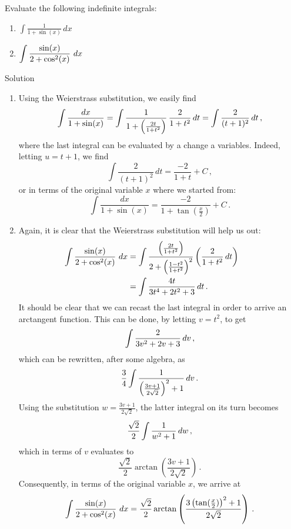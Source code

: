 \begin{example}
Evaluate the following indefinite integrals:
\begin{multicols}{2}
\begin{enumerate}
    \item $\displaystyle {\int\frac {1}{1+\sin(x)}}\,dx $
\item $\ds \int \frac{\sin(x)}{2+\cos^2(x)}\ dx$
\end{enumerate}
\end{multicols}

\pagebreak
{}Solution 


\begin{enumerate}
\item  Using the Weierstrass substitution, we easily find
$$
\displaystyle \int{\frac {dx}{1+\sin(x)}}=\displaystyle\int {\dfrac {1}{1+\left({\frac {2t}{1+t^{2}}}\right)}}\,\dfrac {2}{1+t^{2}}\,dt=\int{\dfrac {2}{(t+1)^{2}}}\,dt\,,
$$
where the last integral can be evaluated by a change a variables. Indeed, letting $u=t+1$, we find 
$$
\int{\dfrac {2}{(t+1)^{2}}}\,dt=\dfrac{-2}{1+t}+C\,,
$$
or in terms of the original variable $x$ where we started from:
$$
\displaystyle \int{\frac {dx}{1+\sin(x)}}=\dfrac{-2}{1+\tan\left(\frac{x}{2}\right)}+C\,.
$$
\item Again, it is clear that the Weierstrass substitution will help us out:
$$
{\displaystyle {\begin{aligned}\displaystyle\int \frac{\sin(x)}{2+\cos^2(x)}\ dx&=\int {\frac {\left({\frac {2t}{1+t^{2}}}\right)}{2+\left({\frac {1-t^2}{1+t^{2}}}\right)^2}}\left({\frac {2}{1+t^{2}}}\,dt\right)\\
&=\int {\frac {4t}{3t^4+2t^2+3}}\,dt\,.&&\end{aligned}}}
$$
It should be clear that we can recast the last integral in order to arrive an arctangent function. This can be done, by letting $v=t^2$, to get 
$$
\displaystyle\int {\frac {2}{3v^2+2v+3}}\,dv\,,
$$
which can be rewritten, after some algebra, as
$$
\dfrac{3}{4}\displaystyle\int {\dfrac {1}{\left(\frac{3v+1}{2\sqrt{2}}\right)^2+1}}\,dv\,.
$$
Using the substitution $w=\frac{3v+1}{2\sqrt{2}}$, the latter integral on its turn becomes
$$
\dfrac{\sqrt{2}}{2}\displaystyle\int\dfrac{1}{w^2+1}\,dw\,,
$$
which in terms of $v$ evaluates to
$$
\dfrac{\sqrt{2}}{2}\arctan\left(\dfrac{3v+1}{2\sqrt{2}}\right)\,.
$$
Consequently, in terms of the original variable $x$, we arrive at 
$$
\ds \int \frac{\sin(x)}{2+\cos^2(x)}\ dx=\dfrac{\sqrt{2}}{2}\arctan\left(\dfrac{3\left(\tan(\frac{x}{2})\right)^2+1}{2\sqrt{2}}\right)\,.
$$

\end{enumerate}
\end{example}


